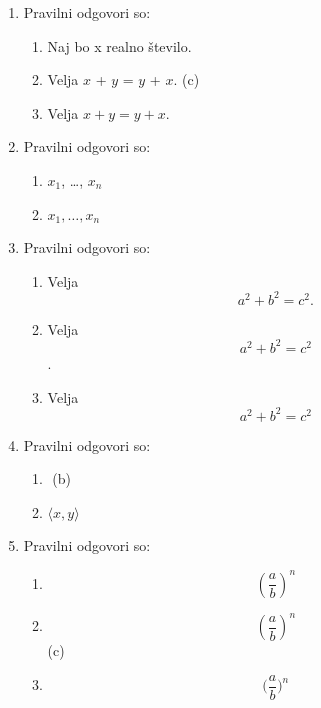 \documentclass[11pt]{article}
\begin{document}
\begin{enumerate}
    \item Pravilni odgovori so: %
    \begin{enumerate}
        \item Naj bo x realno število.
        \item Velja \(x\) + \(y\) = \(y\) + \(x\).
         (c)
        \item Velja \(x + y = y + x\).
    \end{enumerate}

    \item Pravilni odgovori so: %
    \begin{enumerate}
         (a)
        \item \(x_1\), \dots, \(x_n\)
        \item \(x_1, \ldots, x_n\)
    \end{enumerate}

    \item Pravilni odgovori so: %
    \begin{enumerate}
         (a)
        \item
Velja
\[
  a^2 + b^2 = c^2.
\]
        \item
Velja
\[
  a^2 + b^2 = c^2
\]
.
        \item
Velja
\[
  a^2 + b^2 = c^2
\]
    \end{enumerate}

    \item Pravilni odgovori so: %
    \begin{enumerate}
        \item \(<x, y>\)
         (b)
        \item \(\langle x, y \rangle\)
    \end{enumerate}

    \item Pravilni odgovori so: %
    \begin{enumerate}
        \item \[ (\frac{a}{b})^n \]
        \item \[ \left(\frac{a}{b}\right)^n \]
         (c)
        \item \[ \Big(\frac{a}{b}\Big)^n \]
    \end{enumerate}


\end{enumerate}
\end{document}
